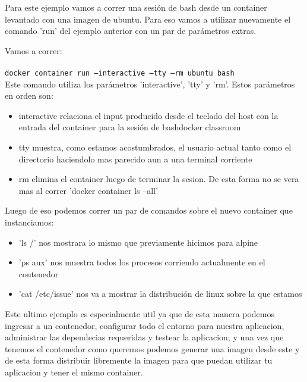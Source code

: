 \documentclass[11pt]{article} %
\begin{document}
Para este ejemplo vamos a correr una sesión de bash desde un container levantado con una imagen de ubuntu. Para eso vamos a utilizar nuevamente el comando 'run' del ejemplo anterior con un par de parámetros extras.

Vamos a correr: \\ \\
	\texttt{docker container run --interactive --tty --rm ubuntu bash}
	\\ 

Este comando utiliza los parámetros 'interactive', 'tty' y 'rm'. Estos parámetros en orden son:
\begin{itemize}

	\item
    interactive relaciona el input producido desde el teclado del host con la entrada del container para la sesión de bashdocker classroom
    
    \item
    tty muestra, como estamos acostumbrados, el usuario actual tanto como el directorio haciendolo mas parecido aun a una terminal corriente
    
    \item
    rm elimina el container luego de terminar la sesion. De esta forma no se vera mas al correr 'docker container ls --all'
\end{itemize}

Luego de eso podemos correr un par de comandos sobre el nuevo container que instanciamos:
\begin{itemize}
	\item    
    'ls /' nos mostrara lo mismo que previamente hicimos para alpine
    
    \item  
    'ps aux' nos muestra todos los procesos corriendo actualmente en el contenedor
    
    \item  
    'cat /etc/issue' nos va a mostrar la distribución de linux sobre la que estamos
\end{itemize}

Este ultimo ejemplo es especialmente util ya que de esta manera podemos ingresar a un contenedor, configurar todo el entorno para nuestra aplicacion, administrar las dependecias requeridas y testear la aplicacion; y una vez que tenemos el contenedor como queremos podemos generar una imagen desde este y de esta forma distribuir libremente la imagen para que puedan utilizar tu aplicacion y tener el mismo container.
\end{document}
